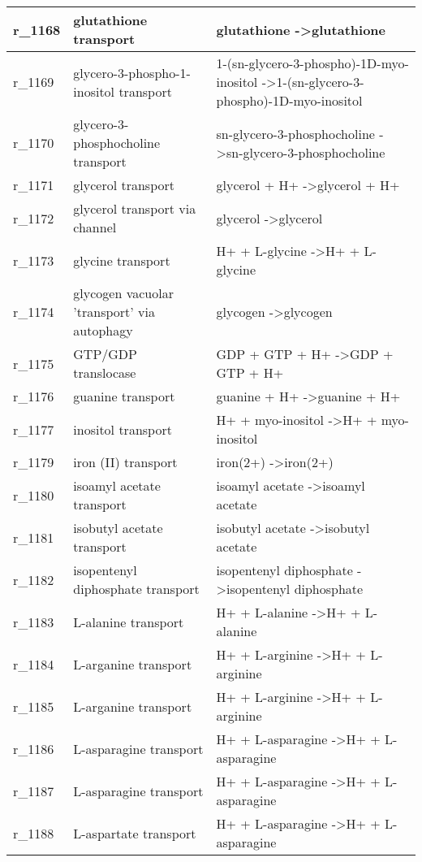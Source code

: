 \begin{landscape}
{\begin{longtable}{|l|p{7cm}|p{15cm}|}
r\_1168 & glutathione transport & glutathione  -\textgreater glutathione \\ \hline
r\_1169 & glycero-3-phospho-1-inositol transport & 1-(sn-glycero-3-phospho)-1D-myo-inositol  -\textgreater 1-(sn-glycero-3-phospho)-1D-myo-inositol \\ \hline
r\_1170 & glycero-3-phosphocholine transport & sn-glycero-3-phosphocholine  -\textgreater sn-glycero-3-phosphocholine \\ \hline
r\_1171 & glycerol transport & glycerol + H+  -\textgreater glycerol + H+ \\ \hline
r\_1172 & glycerol transport via channel & glycerol  -\textgreater glycerol \\ \hline
r\_1173 & glycine transport & H+ + L-glycine  -\textgreater H+ + L-glycine \\ \hline
r\_1174 & glycogen vacuolar 'transport' via autophagy & glycogen  -\textgreater glycogen \\ \hline
r\_1175 & GTP/GDP translocase & GDP + GTP + H+  -\textgreater GDP + GTP + H+ \\ \hline
r\_1176 & guanine transport & guanine + H+  -\textgreater guanine + H+ \\ \hline
r\_1177 & inositol transport & H+ + myo-inositol  -\textgreater H+ + myo-inositol \\ \hline
r\_1179 & iron (II) transport & iron(2+)  -\textgreater iron(2+) \\ \hline
r\_1180 & isoamyl acetate transport & isoamyl acetate  -\textgreater isoamyl acetate \\ \hline
r\_1181 & isobutyl acetate transport & isobutyl acetate  -\textgreater isobutyl acetate \\ \hline
r\_1182 & isopentenyl diphosphate transport & isopentenyl diphosphate  -\textgreater isopentenyl diphosphate \\ \hline
r\_1183 & L-alanine transport & H+ + L-alanine  -\textgreater H+ + L-alanine \\ \hline
r\_1184 & L-arganine transport & H+ + L-arginine  -\textgreater H+ + L-arginine \\ \hline
r\_1185 & L-arganine transport & H+ + L-arginine  -\textgreater H+ + L-arginine \\ \hline
r\_1186 & L-asparagine transport & H+ + L-asparagine  -\textgreater H+ + L-asparagine \\ \hline
r\_1187 & L-asparagine transport & H+ + L-asparagine  -\textgreater H+ + L-asparagine \\ \hline
r\_1188 & L-aspartate transport & H+ + L-asparagine  -\textgreater H+ + L-asparagine \\ \hline

\end{longtable}}
\end{landscape}
